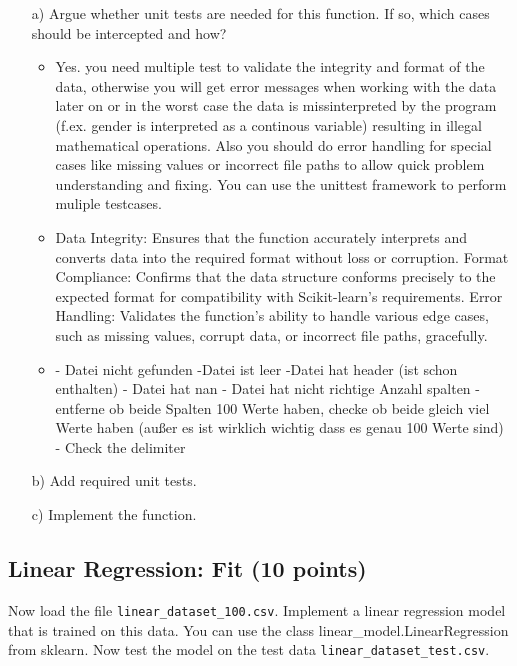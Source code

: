 \documentclass{article}
\begin{document}
\begin{enumerate}

\item[a)] Argue whether unit tests are needed for this function. If so, which cases should be intercepted and how?
	\begin{itemize}
		\item
Yes. you need multiple test to validate the integrity and format of the data, otherwise you will get error messages when working with the data later on or in the worst case the data is missinterpreted by the program (f.ex. gender is interpreted as a continous variable) resulting in illegal mathematical operations. Also you should do error handling for special cases like missing values or incorrect file paths to allow quick problem understanding and fixing.  You can use the unittest framework to perform muliple testcases.
		\item
Data Integrity: Ensures that the function accurately interprets and converts data into the required format without loss or corruption.
Format Compliance: Confirms that the data structure conforms precisely to the expected format for compatibility with Scikit-learn's requirements.
Error Handling: Validates the function's ability to handle various edge cases, such as missing values, corrupt data, or incorrect file paths, gracefully.
		\item
		- Datei nicht gefunden
		-Datei ist leer
		-Datei hat header (ist schon enthalten)
		- Datei hat nan
		- Datei hat nicht richtige Anzahl spalten
		- entferne ob beide Spalten 100 Werte haben, checke ob beide gleich viel Werte haben (außer es ist wirklich wichtig dass es genau 100 Werte sind)
		- Check the delimiter
	\end{itemize}

\item[b)] Add required unit tests.

\item[c)] Implement the function.

\end{enumerate}

\subsection{Linear Regression: Fit (10 points)}

Now load the file \texttt{linear\_dataset\_100.csv}. Implement a linear regression model that is trained on this data. You can use the class linear\_model.LinearRegression from sklearn. Now test the model on the test data \texttt{linear\_dataset\_test.csv}.
\end{document}
